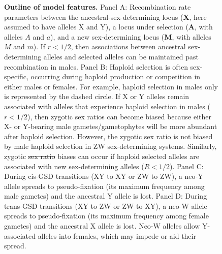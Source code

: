 \documentclass[10pt,letterpaper]{article}
\providecommand{\DIFadd}[1]{{\protect\color{blue}\uwave{#1}}} %
\providecommand{\DIFdel}[1]{{\protect\color{red}\sout{#1}}}                      %
\providecommand{\DIFaddFL}[1]{\DIFadd{#1}} %
\providecommand{\DIFdelFL}[1]{\DIFdel{#1}} %
\providecommand{\DIFaddbeginFL}{} %
\providecommand{\DIFaddendFL}{} %
\providecommand{\DIFdelbeginFL}{} %
\providecommand{\DIFdelendFL}{} %
\begin{document}
\begin{figure}[!h]
\caption{
{\bf Outline of model features.}
Panel A: Recombination rate parameters between the ancestral-sex-determining locus ($\mathbf{X}$, here assumed to have alleles X and Y), a locus under selection ($\mathbf{A}$, with alleles $A$ and $a$), and a new sex-determining locus ($\mathbf{M}$, with alleles $M$ and $m$). 
If $r<1/2$, then associations between ancestral sex-determining alleles and selected alleles can be maintained past recombination in males. 
Panel B: Haploid selection is often sex-specific, occurring during haploid production or competition in either males or females. 
For example, haploid selection in males only is represented by the dashed circle.  
If X or Y alleles remain associated with alleles that experience haploid selection in males ($r<1/2$), then zygotic sex ratios can become biased because either X- or Y-bearing male gametes/gametophytes will be more abundant after haploid selection. 
However, the zygotic sex ratio is not biased by male haploid selection in ZW sex-determining systems. 
Similarly, zygotic \DIFdelbeginFL \DIFdelFL{sex ratio }\DIFdelendFL \DIFaddbeginFL \DIFaddFL{sex-ratio }\DIFaddendFL biases can occur if haploid selected alleles are associated with new sex-determining alleles ($R<1/2$). 
Panel C: During cis-GSD transitions (XY to XY or ZW to ZW), a neo-Y allele spreads to pseudo-fixation (its maximum frequency among male gametes) and the ancestral Y allele is lost. 
Panel D: During trans-GSD transitions (XY to ZW or ZW to XY), a neo-W allele spreads to pseudo-fixation (its maximum frequency among female gametes) and the ancestral X allele is lost. 
Neo-W alleles allow Y-associated alleles into females, which may impede or aid their spread. 
}
\label{fig:model_outline}
\end{figure}
\end{document}
